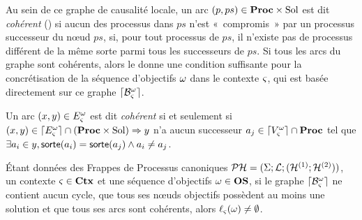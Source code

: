 Au sein de ce graphe de causalité locale, un arc $(p, ps) \in \mathbf{Proc} \times \mathrm{Sol}$
est dit \emph{cohérent} () si aucun des processus dans $ps$
n'est «~compromis~» par un processus successeur du nœud $ps$,
\cad si, pour tout processus de $ps$,
il n'existe pas de processus différent de la même sorte parmi tous les successeurs de $ps$.
%
Si tous les arcs du graphe sont cohérents, alors le 
donne une condition suffisante pour la concrétisation de la séquence d'objectifs $\omega$
dans le contexte $\varsigma$, qui est basée directement sur ce graphe $\lceil \mathcal{B}_\varsigma^\omega\rceil$.

\begin{definition}
  Un arc $(x, y) \in E_\varsigma^\omega$ est dit \emph{cohérent} si et seulement si
  $(x, y) \in \lceil E_\varsigma^\omega\rceil \cap (\mathbf{Proc} \times \mathrm{Sol}) \Rightarrow y$ n'a aucun successeur
  $a_j \in \lceil V_\varsigma^\omega\rceil \cap \mathbf{Proc}$
  tel que $\exists a_i \in y, \mathsf{sorte}(a_i) = \mathsf{sorte}(a_j) \wedge a_i \neq a_j$.
\end{definition}

\begin{theorem}
  Étant données des Frappes de Processus canoniques $\mathcal{PH} = (\Sigma; \mathcal{L}; (\mathcal{H}^{(1)};\mathcal{H}^{(2)}))$,
  un contexte $\varsigma \in \mathbf{Ctx}$ et une séquence d'objectifs $\omega \in \mathbf{OS}$,
  si le graphe $\lceil \mathcal{B}_\varsigma^\omega\rceil$ ne contient aucun cycle,
  que tous ses nœuds objectifs possèdent au moins une solution
  et que tous ses arcs sont cohérents,
  alors $\ell_\varsigma(\omega) \neq \emptyset$.
\end{theorem}

